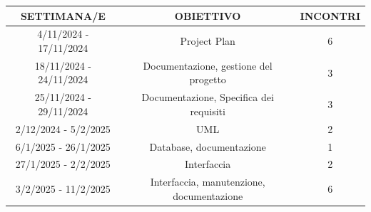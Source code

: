 \documentclass[a4paper,12pt]{article}
\begin{document}
\begin{center}
\begin{tabular}{|c|c|c|}
\hline
\textbf{SETTIMANA/E} & \textbf{OBIETTIVO} & \textbf{INCONTRI } \\
\hline
4/11/2024 - 17/11/2024 & Project Plan & 6 \\
\hline
18/11/2024 - 24/11/2024 & Documentazione, gestione del progetto & 3 \\
\hline
25/11/2024 - 29/11/2024 & Documentazione, Specifica dei requisiti  & 3 \\
\hline
2/12/2024 - 5/2/2025 & UML & 2 \\
\hline
6/1/2025 - 26/1/2025 & Database, documentazione & 1 \\
\hline
27/1/2025 - 2/2/2025 & Interfaccia & 2 \\
\hline
3/2/2025 - 11/2/2025 & Interfaccia, manutenzione, documentazione & 6 \\
\hline


\end{tabular}
\end{center}
\end{document}
